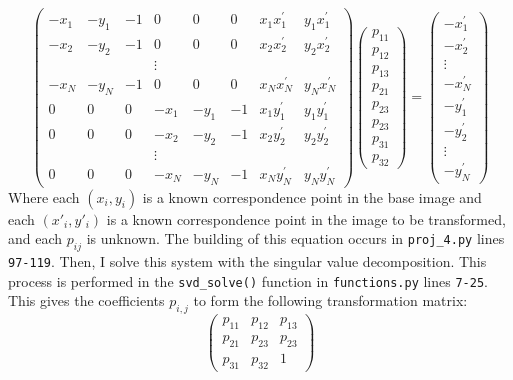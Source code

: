 \documentclass[]{article}
\begin{document}
	\[\left(\begin{array}{cccccccc}
		-x_{1} & -y_{1} & -1 & 0 & 0 & 0 & x_{1} x_{1}^{\prime} & y_{1} x_{1}^{\prime} \\
		-x_{2} & -y_{2} & -1 & 0 & 0 & 0 & x_{2} x_{2}^{\prime} & y_{2} x_{2}^{\prime} \\
		&&&\vdots&&&&\\
		-x_{N} & -y_{N} & -1 & 0 & 0 & 0 & x_{N} x_{N}^{\prime} & y_{N} x_{N}^{\prime} \\
		0 & 0 & 0 & -x_{1} & -y_{1} & -1 & x_{1} y_{1}^{\prime} & y_{1} y_{1}^{\prime} \\
		0 & 0 & 0 & -x_{2} & -y_{2} & -1 & x_{2} y_{2}^{\prime} & y_{2} y_{2}^{\prime} \\
		&&&\vdots&&&&\\
		0 & 0 & 0 & -x_{N} & -y_{N} & -1 & x_{N} y_{N}^{\prime} & y_{N} y_{N}^{\prime}
	\end{array}\right)\left(\begin{array}{c}
		p_{11} \\
		p_{12} \\
		p_{13} \\
		p_{21} \\
		p_{23} \\
		p_{23} \\
		p_{31} \\
		p_{32}
	\end{array}\right) = \left(\begin{array}{c}
		-x_{1}^{\prime} \\
		-x_{2}^{\prime} \\
		\vdots \\
		-x_{N}^{\prime} \\
		-y_{1}^{\prime} \\
		-y_{2}^{\prime} \\
		\vdots \\
		-y_{N}^{\prime}
		\end{array}\right)\]
Where each $(x_i,y_i)$ is a known correspondence point in the base image and each $(x'_i,y'_i)$ is a known correspondence point in the image to be transformed, and each $p_{ij}$ is unknown. The building of this equation occurs in \texttt{proj\_4.py} lines \texttt{97-119}. Then, I solve this system with the singular value decomposition. This process is performed in the \texttt{svd\_solve()} function in \texttt{functions.py} lines \texttt{7-25}. This gives the coefficients $p_{i,j}$ to form the following transformation matrix:
\[\left(\begin{array}{ccc}
	p_{11} & p_{12} & p_{13} \\
	p_{21} & p_{23} & p_{23} \\
	p_{31} & p_{32} & 1
\end{array}\right)\]
\end{document}
